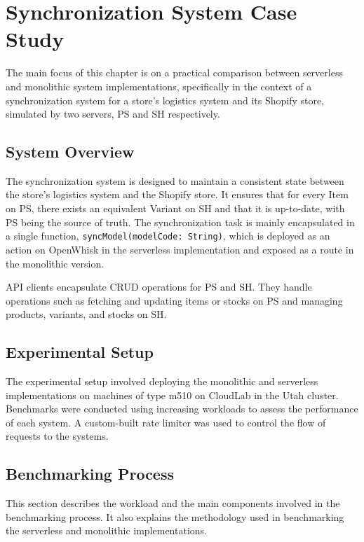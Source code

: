 \chapter{Synchronization System Case Study}
\etocsettocstyle{\rule{\textwidth}{1pt}}{\rule{\textwidth}{1pt}} %
\localtableofcontents
\label{chap:synchronization}

The main focus of this chapter is on a practical comparison between serverless and monolithic system implementations, specifically in the context of a synchronization system for a store's logistics system and its Shopify store, simulated by two servers, PS and SH respectively.

\section{System Overview}

The synchronization system is designed to maintain a consistent state between the store's logistics system and the Shopify store. It ensures that for every Item on PS, there exists an equivalent Variant on SH and that it is up-to-date, with PS being the source of truth. The synchronization task is mainly encapsulated in a single function, \texttt{syncModel(modelCode: String)}, which is deployed as an action on OpenWhisk in the serverless implementation and exposed as a route in the monolithic version.

API clients encapsulate CRUD operations for PS and SH. They handle operations such as fetching and updating items or stocks on PS and managing products, variants, and stocks on SH. 

\section{Experimental Setup}

The experimental setup involved deploying the monolithic and serverless implementations on machines of type m510 on CloudLab in the Utah cluster. Benchmarks were conducted using increasing workloads to assess the performance of each system. A custom-built rate limiter was used to control the flow of requests to the systems.

\section{Benchmarking Process}

This section describes the workload and the main components involved in the benchmarking process. It also explains the methodology used in benchmarking the serverless and monolithic implementations.

